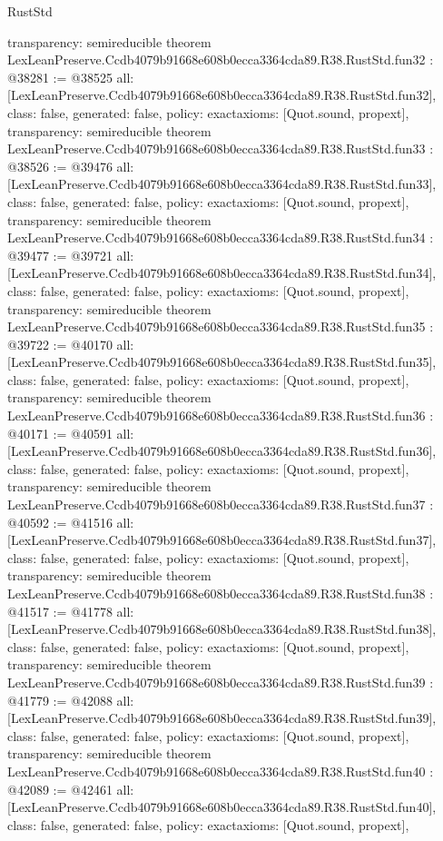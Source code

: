 \begin{lexlean}{RustStd}
\begin{coremodule}
{  transparency: semireducible
}
theorem LexLeanPreserve.Ccdb4079b91668e608b0ecca3364cda89.R38.RustStd.fun32 : @38281 := @38525 {
  all: [LexLeanPreserve.Ccdb4079b91668e608b0ecca3364cda89.R38.RustStd.fun32],
  class: false,
  generated: false,
  policy: exact{axioms: [Quot.sound, propext]},
  transparency: semireducible
}
theorem LexLeanPreserve.Ccdb4079b91668e608b0ecca3364cda89.R38.RustStd.fun33 : @38526 := @39476 {
  all: [LexLeanPreserve.Ccdb4079b91668e608b0ecca3364cda89.R38.RustStd.fun33],
  class: false,
  generated: false,
  policy: exact{axioms: [Quot.sound, propext]},
  transparency: semireducible
}
theorem LexLeanPreserve.Ccdb4079b91668e608b0ecca3364cda89.R38.RustStd.fun34 : @39477 := @39721 {
  all: [LexLeanPreserve.Ccdb4079b91668e608b0ecca3364cda89.R38.RustStd.fun34],
  class: false,
  generated: false,
  policy: exact{axioms: [Quot.sound, propext]},
  transparency: semireducible
}
theorem LexLeanPreserve.Ccdb4079b91668e608b0ecca3364cda89.R38.RustStd.fun35 : @39722 := @40170 {
  all: [LexLeanPreserve.Ccdb4079b91668e608b0ecca3364cda89.R38.RustStd.fun35],
  class: false,
  generated: false,
  policy: exact{axioms: [Quot.sound, propext]},
  transparency: semireducible
}
theorem LexLeanPreserve.Ccdb4079b91668e608b0ecca3364cda89.R38.RustStd.fun36 : @40171 := @40591 {
  all: [LexLeanPreserve.Ccdb4079b91668e608b0ecca3364cda89.R38.RustStd.fun36],
  class: false,
  generated: false,
  policy: exact{axioms: [Quot.sound, propext]},
  transparency: semireducible
}
theorem LexLeanPreserve.Ccdb4079b91668e608b0ecca3364cda89.R38.RustStd.fun37 : @40592 := @41516 {
  all: [LexLeanPreserve.Ccdb4079b91668e608b0ecca3364cda89.R38.RustStd.fun37],
  class: false,
  generated: false,
  policy: exact{axioms: [Quot.sound, propext]},
  transparency: semireducible
}
theorem LexLeanPreserve.Ccdb4079b91668e608b0ecca3364cda89.R38.RustStd.fun38 : @41517 := @41778 {
  all: [LexLeanPreserve.Ccdb4079b91668e608b0ecca3364cda89.R38.RustStd.fun38],
  class: false,
  generated: false,
  policy: exact{axioms: [Quot.sound, propext]},
  transparency: semireducible
}
theorem LexLeanPreserve.Ccdb4079b91668e608b0ecca3364cda89.R38.RustStd.fun39 : @41779 := @42088 {
  all: [LexLeanPreserve.Ccdb4079b91668e608b0ecca3364cda89.R38.RustStd.fun39],
  class: false,
  generated: false,
  policy: exact{axioms: [Quot.sound, propext]},
  transparency: semireducible
}
theorem LexLeanPreserve.Ccdb4079b91668e608b0ecca3364cda89.R38.RustStd.fun40 : @42089 := @42461 {
  all: [LexLeanPreserve.Ccdb4079b91668e608b0ecca3364cda89.R38.RustStd.fun40],
  class: false,
  generated: false,
  policy: exact{axioms: [Quot.sound, propext]},
}
\end{coremodule}
\end{lexlean}

